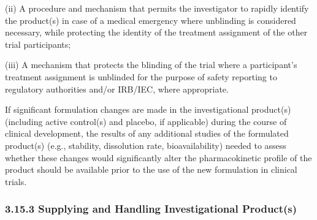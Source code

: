 \documentclass[11pt]{article}
\begin{document}
(ii) A procedure and mechanism that permits the investigator to rapidly identify the product(s) in case of a medical emergency where unblinding is considered necessary, while protecting the identity of the treatment assignment of the other trial participants;


(iii) A mechanism that protects the blinding of the trial where a participant's treatment assignment is unblinded for the purpose of safety reporting to regulatory authorities and/or IRB/IEC, where appropriate.


\begin{description}[leftmargin=2.5cm,style=sameline]

\item[(e)] If significant formulation changes are made in the investigational product(s) (including active control(s) and placebo, if applicable) during the course of clinical development, the results of any additional studies of the formulated product(s) (e.g., stability, dissolution rate, bioavailability) needed to assess whether these changes would significantly alter the pharmacokinetic profile of the product should be available prior to the use of the new formulation in clinical trials.

\end{description}

\subsubsection{3.15.3 Supplying and Handling Investigational Product(s)}
\end{document}
